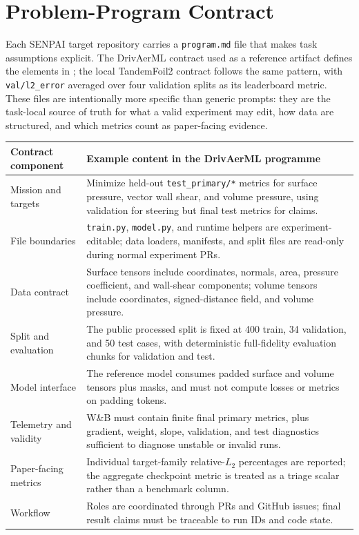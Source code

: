 \documentclass{article}
\begin{document}
\section{Problem-Program Contract}
\label{app:program-contracts}

Each SENPAI target repository carries a \texttt{program.md} file that makes task assumptions explicit. The DrivAerML contract used as a reference artifact defines the elements in ; the local TandemFoil2 contract follows the same pattern, with \texttt{val/l2\_error} averaged over four validation splits as its leaderboard metric. These files are intentionally more specific than generic prompts: they are the task-local source of truth for what a valid experiment may edit, how data are structured, and which metrics count as paper-facing evidence.

\begin{center}
  \label{tab:program-contract}
  \small
  \begin{tabular}{@{}p{}p{}@{}}
    \toprule
    Contract component & Example content in the DrivAerML programme \\
    \midrule
    Mission and targets & Minimize held-out \texttt{test\_primary/*} metrics for surface pressure, vector wall shear, and volume pressure, using validation for steering but final test metrics for claims. \\
    File boundaries & \texttt{train.py}, \texttt{model.py}, and runtime helpers are experiment-editable; data loaders, manifests, and split files are read-only during normal experiment PRs. \\
    Data contract & Surface tensors include coordinates, normals, area, pressure coefficient, and wall-shear components; volume tensors include coordinates, signed-distance field, and volume pressure. \\
    Split and evaluation & The public processed split is fixed at 400 train, 34 validation, and 50 test cases, with deterministic full-fidelity evaluation chunks for validation and test. \\
    Model interface & The reference model consumes padded surface and volume tensors plus masks, and must not compute losses or metrics on padding tokens. \\
    Telemetry and validity & W\&B must contain finite final primary metrics, plus gradient, weight, slope, validation, and test diagnostics sufficient to diagnose unstable or invalid runs. \\
    Paper-facing metrics & Individual target-family relative-$L_2$ percentages are reported; the aggregate checkpoint metric is treated as a triage scalar rather than a benchmark column. \\
    Workflow & Roles are coordinated through PRs and GitHub issues; final result claims must be traceable to run IDs and code state. \\
    \bottomrule
  \end{tabular}
\end{center}
\end{document}
